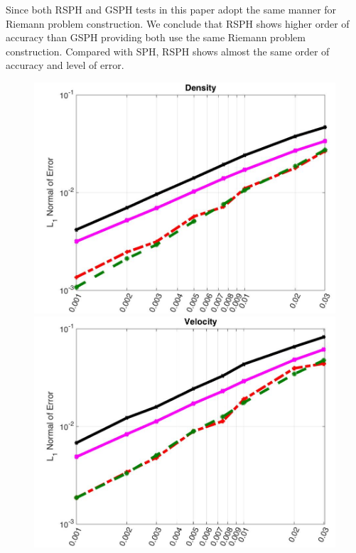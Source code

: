\documentclass[preprint,12pt,authoryear]{elsarticle}
\begin{document}
Since both RSPH and GSPH tests in this paper adopt the same manner for Riemann problem construction. We conclude that RSPH shows higher order of accuracy than GSPH providing both use the same Riemann problem construction. Compared with SPH, RSPH shows almost the same order of accuracy and level of error.
 
\begin{figure}[H]
    \centering
    \begin{minipage}{.30\textwidth}
        \centering
        \includegraphics[width=0.99 \textwidth]{./Figures/Accuracy-des}
    \end{minipage}%
    \begin{minipage}{.30 \textwidth}
        \centering
        \includegraphics[width=0.99 \textwidth]{./Figures/Accuracy-vel}

\end{minipage}
\end{figure}
\end{document}
